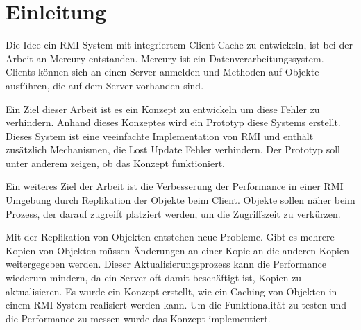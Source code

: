 \chapter{Einleitung}

Die Idee ein RMI-System mit integriertem Client-Cache zu entwickeln, ist bei der Arbeit an Mercury entstanden. Mercury ist ein Datenverarbeitungssystem. Clients können sich an einen Server anmelden und Methoden auf Objekte ausführen, die auf dem Server vorhanden sind. 

Ein Ziel dieser Arbeit ist es ein Konzept zu entwickeln um
diese Fehler zu verhindern. Anhand dieses Konzeptes wird ein Prototyp
diese Systems erstellt. Dieses System ist eine veeinfachte
Implementation von RMI und enthält zusätzlich Mechanismen, die Lost
Update Fehler verhindern. Der Prototyp soll unter anderem zeigen, ob
das Konzept funktioniert. 

Ein weiteres Ziel der Arbeit ist die Verbesserung der Performance in einer RMI Umgebung durch Replikation der Objekte beim Client. Objekte sollen näher beim Prozess, der darauf zugreift platziert werden, um die Zugriffszeit zu verkürzen.

Mit der Replikation von Objekten entstehen neue Probleme. Gibt es mehrere Kopien von Objekten müssen Änderungen an einer Kopie an die anderen Kopien weitergegeben werden. Dieser Aktualisierungsprozess kann die Performance wiederum mindern, da ein Server oft damit beschäftigt ist, Kopien zu aktualisieren. Es wurde ein Konzept erstellt, wie ein Caching von Objekten in einem RMI-System realisiert werden kann. Um die Funktionalität zu testen und die Performance zu messen wurde das Konzept implementiert. 
